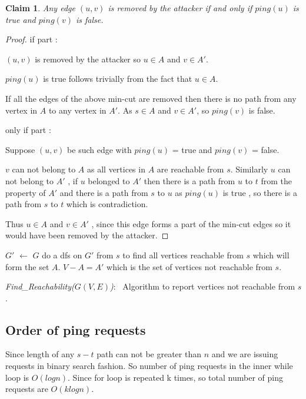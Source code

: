 \documentclass[11pt]{article}
\newtheorem{claim}[theorem]{Claim}
\begin{document}
\begin{claim}
Any edge $(u,v)$ is removed by the attacker if and only if $ping(u)$ is true and $ping(v)$ is false. 
\label{ping}
\end{claim}
\begin{proof}
if part :

$(u,v)$ is removed by the attacker so $u \in A$ and $v \in A'$.

$ping(u)$ is true follows trivially from the fact that $u \in A$.

If all the edges of the above min-cut are removed then there is no path from any vertex in $A$ to any vertex in $A'$. 
As $s \in A$ and $v \in A'$, so $ping(v)$ is false.

only if part :

Suppose $(u,v)$ be such edge with $ping(u)$ = true and $ping(v)$ = false.

$v$ can not belong to $A$ as all vertices in $A$ are reachable from $s$. Similarly $u$ can not belong to $A'$ , if $u$ belonged to $A'$ then there is a path from $u$ to $t$ from the property of $A'$ and there is a path from $s$ to $u$ as $ping(u)$ is true , so there is a path from $s$ to $t$ which is contradiction. 

Thus $u \in A$ and $v \in A'$ , since this edge forms a part of the min-cut edges so it would have been removed by the attacker.

\end{proof}

\begin{algorithm}[h]
$G'$ $\leftarrow$ $G$ \;
do a dfs on $G'$ from $s$ to find all vertices reachable from $s$ which will form the set $A$. \;
$V-A = A'$ which is the set of vertices not reachable from $s$. \;
\caption{{\em Find\_Reachability($G(V,E)$)}:~
Algorithm to report vertices not reachable from $s$.
}
\label{Algorithm}
\end{algorithm}
\subsection*{Order of ping requests}
Since length of any $s-t$ path can not be greater than $n$ and we are issuing requests in binary search fashion. 
So number of ping requests in the inner while loop is $O(log n)$.
Since for loop is repeated k times, so total number of ping requests are $O(k logn)$.
\end{document}
